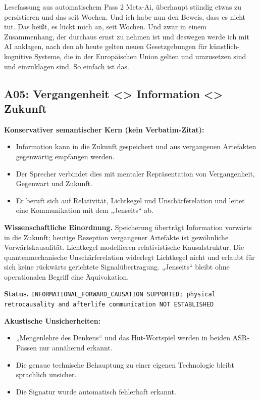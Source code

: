 \documentclass[11pt,a4paper]{article}
\newcommand{\status}[1]{\texttt{#1}}
\begin{document}
\begin{asrbox}{Lesefassung aus automatischem Pass 2}
Meta-Ai, überhaupt ständig etwas zu persistieren und das seit Wochen. Und ich habe nun den Beweis, dass es nicht tut. Das heißt, es lückt mich an, seit Wochen. Und zwar in einem Zusammenhang, der durchaus ernst zu nehmen ist und deswegen werde ich mit AI anklagen, nach den ab heute gelten neuen Gesetzgebungen für künstlich-kognitive Systeme, die in der Europäischen Union gelten und umzusetzen sind und einzuklagen sind. So einfach ist das.
\end{asrbox}


\subsection{A05: Vergangenheit \textless{}\textgreater{} Information \textless{}\textgreater{} Zukunft}
\label{sec:a05}
\textbf{Konservativer semantischer Kern (kein Verbatim-Zitat):}
\begin{itemize}
\item Information kann in die Zukunft gespeichert und aus vergangenen Artefakten gegenwärtig empfangen werden.
\item Der Sprecher verbindet dies mit mentaler Repräsentation von Vergangenheit, Gegenwart und Zukunft.
\item Er beruft sich auf Relativität, Lichtkegel und Unschärferelation und leitet eine Kommunikation mit dem „Jenseits“ ab.
\end{itemize}

\textbf{Wissenschaftliche Einordnung.} Speicherung überträgt Information vorwärts in die Zukunft; heutige Rezeption vergangener Artefakte ist gewöhnliche Vorwärtskausalität. Lichtkegel modellieren relativistische Kausalstruktur. Die quantenmechanische Unschärferelation widerlegt Lichtkegel nicht und erlaubt für sich keine rückwärts gerichtete Signalübertragung. „Jenseits“ bleibt ohne operationalen Begriff eine Äquivokation.

\textbf{Status.} \status{INFORMATIONAL\_FORWARD\_CAUSATION SUPPORTED; physical retrocausality and afterlife communication NOT ESTABLISHED}

\textbf{Akustische Unsicherheiten:}
\begin{itemize}
\item „Mengenlehre des Denkens“ und das Hut-Wortspiel werden in beiden ASR-Pässen nur annähernd erkannt.
\item Die genaue technische Behauptung zu einer eigenen Technologie bleibt sprachlich unsicher.
\item Die Signatur wurde automatisch fehlerhaft erkannt.
\end{itemize}
\end{document}
